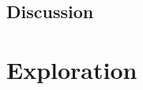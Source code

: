 \documentclass[a4paper,11pt]{article}
\begin{document}
\subsection{Discussion}


\section{Exploration}






\end{document}
